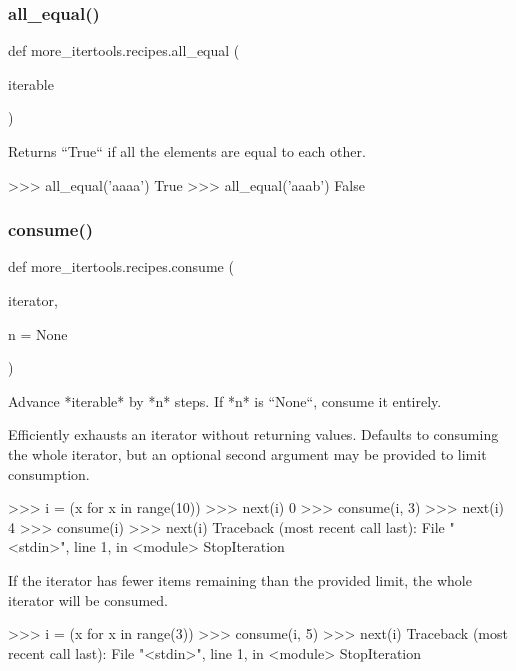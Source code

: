 \subsubsection{\texorpdfstring{all\+\_\+equal()}{all\_equal()}}
{\footnotesize\ttfamily def more\+\_\+itertools.\+recipes.\+all\+\_\+equal (\begin{DoxyParamCaption}\item[{}]{iterable }\end{DoxyParamCaption})}

\begin{DoxyVerb}Returns ``True`` if all the elements are equal to each other.

    >>> all_equal('aaaa')
    True
    >>> all_equal('aaab')
    False\end{DoxyVerb}
 \mbox{\label{namespacemore__itertools_1_1recipes_ac9f06068415d848706d2610a7a5cfb1d}} 
\subsubsection{\texorpdfstring{consume()}{consume()}}
{\footnotesize\ttfamily def more\+\_\+itertools.\+recipes.\+consume (\begin{DoxyParamCaption}\item[{}]{iterator,  }\item[{}]{n = {\ttfamily None} }\end{DoxyParamCaption})}

\begin{DoxyVerb}Advance *iterable* by *n* steps. If *n* is ``None``, consume it
entirely.

Efficiently exhausts an iterator without returning values. Defaults to
consuming the whole iterator, but an optional second argument may be
provided to limit consumption.

    >>> i = (x for x in range(10))
    >>> next(i)
    0
    >>> consume(i, 3)
    >>> next(i)
    4
    >>> consume(i)
    >>> next(i)
    Traceback (most recent call last):
      File "<stdin>", line 1, in <module>
    StopIteration

If the iterator has fewer items remaining than the provided limit, the
whole iterator will be consumed.

    >>> i = (x for x in range(3))
    >>> consume(i, 5)
    >>> next(i)
    Traceback (most recent call last):
      File "<stdin>", line 1, in <module>
    StopIteration\end{DoxyVerb}
 \mbox{\label{namespacemore__itertools_1_1recipes_af69e810bf23869a13ece58c041a621e7}} 
